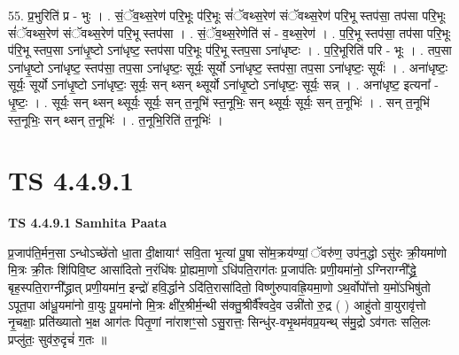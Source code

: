 \documentclass[17pt]{extarticle}
\begin{document}
55. प्र॒भुरिति॑ प्र - भुः । . सं॒ॅव॒थ्स॒रेण॑ परि॒भूः प॑रि॒भूः सं॑ॅवथ्स॒रेण॑ संॅवथ्स॒रेण॑ परि॒भू स्तप॑सा॒ तप॑सा परि॒भूः सं॑ॅवथ्स॒रेण॑ संॅवथ्स॒रेण॑ परि॒भू स्तप॑सा । . सं॒ॅव॒थ्स॒रेणेति॑ सं - व॒थ्स॒रेण॑ । . प॒रि॒भू स्तप॑सा॒ तप॑सा परि॒भूः प॑रि॒भू स्तप॒सा ऽना॑धृ॒ष्टो ऽना॑धृष्ट॒ स्तप॑सा परि॒भूः प॑रि॒भू स्तप॒सा ऽना॑धृष्टः । . प॒रि॒भूरिति॑ परि - भूः । . तप॒सा ऽना॑धृ॒ष्टो ऽना॑धृष्ट॒ स्तप॑सा॒ तप॒सा ऽना॑धृष्टः॒ सूर्यः॒ सूर्यो ऽना॑धृष्ट॒ स्तप॑सा॒ तप॒सा ऽना॑धृष्टः॒ सूर्यः॑ । . अना॑धृष्टः॒ सूर्यः॒ सूर्यो ऽना॑धृ॒ष्टो ऽना॑धृष्टः॒ सूर्यः॒ सन् थ्सन् थ्सूर्यो ऽना॑धृ॒ष्टो ऽना॑धृष्टः॒ सूर्यः॒ सन्न् । . अना॑धृष्ट॒ इत्यना᳚ - धृ॒ष्टः॒ । . सूर्यः॒ सन् थ्सन् थ्सूर्यः॒ सूर्यः॒ सन् त॒नूभि॑ स्त॒नूभिः॒ सन् थ्सूर्यः॒ सूर्यः॒ सन् त॒नूभिः॑ । . सन् त॒नूभि॑ स्त॒नूभिः॒ सन् थ्सन् त॒नूभिः॑ । . त॒नूभि॒रिति॑ त॒नूभिः॑ । \newline
\pagebreak
{}

\section{ TS 4.4.9.1 }

\textbf{TS 4.4.9.1 } \newline
\textbf{Samhita Paata} \newline

प्र॒जाप॑ति॒र्मन॒सा ऽन्धोऽच्छे॑तो धा॒ता दी॒क्षायाꣳ॑ सवि॒ता भृ॒त्यां पू॒षा सो॑म॒क्रय॑ण्यां॒ ॅवरु॑ण॒ उप॑न॒द्धो ऽसु॑रः क्री॒यमा॑णो मि॒त्रः क्री॒तः शि॑पिवि॒ष्ट आसा॑दितो न॒रंधि॑षः प्रो॒ह्यमा॒णो ऽधि॑पति॒राग॑तः प्र॒जाप॑तिः प्रणी॒यमा॑नो॒ ऽग्निराग्नी᳚द्ध्रे॒ बृह॒स्पति॒राग्नी᳚द्ध्रात् प्रणी॒यमा॑न॒ इन्द्रो॑ हवि॒र्द्धाने ऽदि॑ति॒रासा॑दितो॒ विष्णु॑रुपावह्रि॒यमा॒णो ऽथ॒र्वोपो᳚त्तो य॒मो॑ऽभिषु॑तो ऽपूत॒पा आ॑धू॒यमा॑नो वा॒युः पू॒यमा॑नो मि॒त्रः क्षी॑र॒श्रीर्म॒न्थी स॑क्तु॒श्रीर्वै᳚श्वदे॒व उन्नी॑तो रु॒द्र ( ) आहु॑तो वा॒युरावृ॑त्तो नृ॒चक्षाः॒ प्रति॑ख्यातो भ॒क्ष आग॑तः पितृ॒णां ना॑राशꣳ॒॒सो ऽसु॒रात्तः॒ सिन्धु॑र-वभृ॒थम॑वप्र॒यन्थ् स॑मु॒द्रो ऽव॑गतः सलि॒लः प्रप्लु॑तः॒ सुव॑रु॒दृचं॑ ग॒तः ॥ \newline
\end{document}
